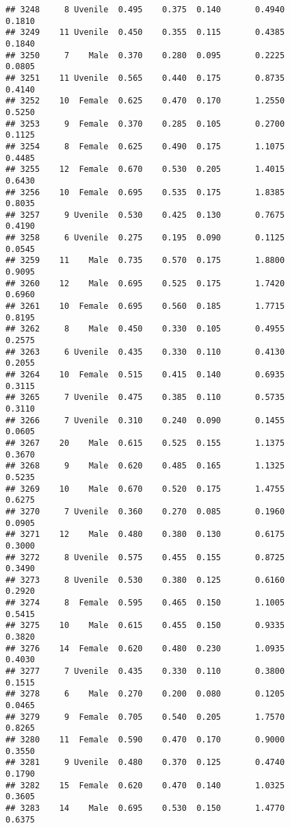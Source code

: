 \documentclass[
]{article}
\begin{document}
\begin{verbatim}
## 3248     8 Uvenile  0.495    0.375  0.140       0.4940         0.1810
## 3249    11 Uvenile  0.450    0.355  0.115       0.4385         0.1840
## 3250     7    Male  0.370    0.280  0.095       0.2225         0.0805
## 3251    11 Uvenile  0.565    0.440  0.175       0.8735         0.4140
## 3252    10  Female  0.625    0.470  0.170       1.2550         0.5250
## 3253     9  Female  0.370    0.285  0.105       0.2700         0.1125
## 3254     8  Female  0.625    0.490  0.175       1.1075         0.4485
## 3255    12  Female  0.670    0.530  0.205       1.4015         0.6430
## 3256    10  Female  0.695    0.535  0.175       1.8385         0.8035
## 3257     9 Uvenile  0.530    0.425  0.130       0.7675         0.4190
## 3258     6 Uvenile  0.275    0.195  0.090       0.1125         0.0545
## 3259    11    Male  0.735    0.570  0.175       1.8800         0.9095
## 3260    12    Male  0.695    0.525  0.175       1.7420         0.6960
## 3261    10  Female  0.695    0.560  0.185       1.7715         0.8195
## 3262     8    Male  0.450    0.330  0.105       0.4955         0.2575
## 3263     6 Uvenile  0.435    0.330  0.110       0.4130         0.2055
## 3264    10  Female  0.515    0.415  0.140       0.6935         0.3115
## 3265     7 Uvenile  0.475    0.385  0.110       0.5735         0.3110
## 3266     7 Uvenile  0.310    0.240  0.090       0.1455         0.0605
## 3267    20    Male  0.615    0.525  0.155       1.1375         0.3670
## 3268     9    Male  0.620    0.485  0.165       1.1325         0.5235
## 3269    10    Male  0.670    0.520  0.175       1.4755         0.6275
## 3270     7 Uvenile  0.360    0.270  0.085       0.1960         0.0905
## 3271    12    Male  0.480    0.380  0.130       0.6175         0.3000
## 3272     8 Uvenile  0.575    0.455  0.155       0.8725         0.3490
## 3273     8 Uvenile  0.530    0.380  0.125       0.6160         0.2920
## 3274     8  Female  0.595    0.465  0.150       1.1005         0.5415
## 3275    10    Male  0.615    0.455  0.150       0.9335         0.3820
## 3276    14  Female  0.620    0.480  0.230       1.0935         0.4030
## 3277     7 Uvenile  0.435    0.330  0.110       0.3800         0.1515
## 3278     6    Male  0.270    0.200  0.080       0.1205         0.0465
## 3279     9  Female  0.705    0.540  0.205       1.7570         0.8265
## 3280    11  Female  0.590    0.470  0.170       0.9000         0.3550
## 3281     9 Uvenile  0.480    0.370  0.125       0.4740         0.1790
## 3282    15  Female  0.620    0.470  0.140       1.0325         0.3605
## 3283    14    Male  0.695    0.530  0.150       1.4770         0.6375

\end{verbatim}
\end{document}
